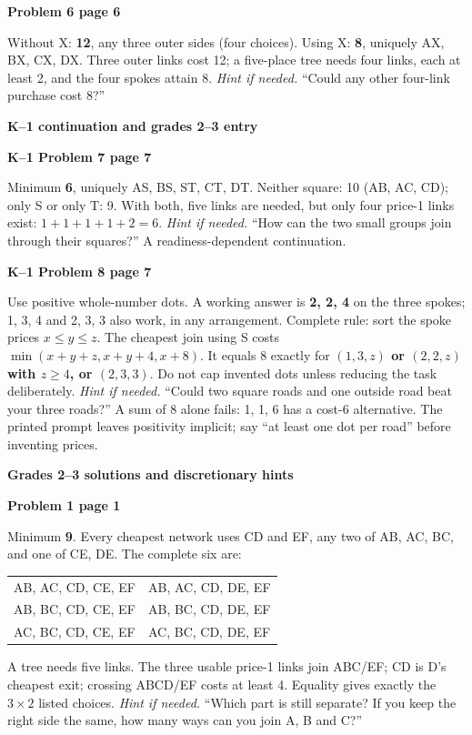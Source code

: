 \documentclass[11pt]{article}
\newcommand{\head}[1]{\par{\large\bfseries #1}\par\nobreak}
\newcommand{\sub}[1]{\par\textbf{#1}\par\nobreak}
\newcommand{\hint}[1]{\textit{Hint if needed.} #1}
\begin{document}
\sub{Problem 6 page 6}
Without X: \textbf{12}, any three outer sides (four choices). Using X: \textbf{8}, uniquely AX, BX, CX, DX. Three outer links cost 12; a five-place tree needs four links, each at least 2, and the four spokes attain 8. \hint{``Could any other four-link purchase cost 8?''}

\bigskip
\head{K--1 continuation and grades 2--3 entry}
\sub{K--1 Problem 7 page 7}\label{two-squares}
Minimum \textbf{6}, uniquely AS, BS, ST, CT, DT. Neither square: 10 (AB, AC, CD); only S or only T: 9. With both, five links are needed, but only four price-1 links exist: $1+1+1+1+2=6$. \hint{``How can the two small groups join through their squares?''} A readiness-dependent continuation.

\sub{K--1 Problem 8 page 7}
Use positive whole-number dots. A working answer is \textbf{2, 2, 4} on the three spokes; 1, 3, 4 and 2, 3, 3 also work, in any arrangement. Complete rule: sort the spoke prices $x\le y\le z$. The cheapest join using S costs $\min(x+y+z,x+y+4,x+8)$. It equals 8 exactly for \textbf{$(1,3,z)$ or $(2,2,z)$ with $z\ge4$, or $(2,3,3)$}. Do not cap invented dots unless reducing the task deliberately. \hint{``Could two square roads and one outside road beat your three roads?''} A sum of 8 alone fails: 1, 1, 6 has a cost-6 alternative. The printed prompt leaves positivity implicit; say ``at least one dot per road'' before inventing prices.
\head{Grades 2--3 solutions and discretionary hints}
\sub{Problem 1 page 1}\label{six-networks}
Minimum \textbf{9}. Every cheapest network uses CD and EF, any two of AB, AC, BC, and one of CE, DE. The complete six are:
\begin{center}\small
\begin{tabular}{ll}
AB, AC, CD, CE, EF & AB, AC, CD, DE, EF\\
AB, BC, CD, CE, EF & AB, BC, CD, DE, EF\\
AC, BC, CD, CE, EF & AC, BC, CD, DE, EF
\end{tabular}
\end{center}
A tree needs five links. The three usable price-1 links join ABC/EF; CD is D's cheapest exit; crossing ABCD/EF costs at least 4. Equality gives exactly the $3\times2$ listed choices. \hint{``Which part is still separate? If you keep the right side the same, how many ways can you join A, B and C?''}
\end{document}
